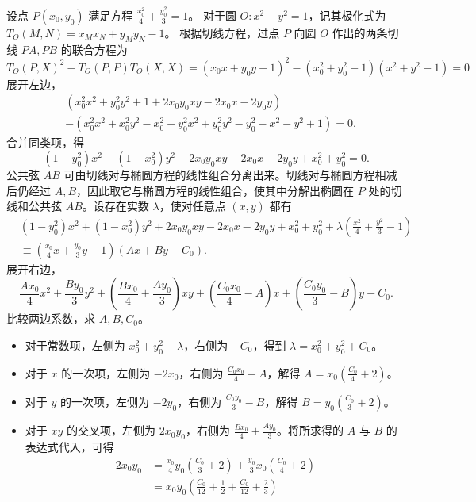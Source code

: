 \begin{solution}
设点 $P(x_0, y_0)$ 满足方程 $\frac{x_0^2}{4} + \frac{y_0^2}{3} = 1$。
对于圆 $O: x^2 + y^2 = 1$，记其极化式为 $T_O(M, N) = x_M x_N + y_M y_N - 1$。
根据切线方程，过点 $P$ 向圆 $O$ 作出的两条切线 $PA, PB$ 的联合方程为
\[ T_O(P, X)^2 - T_O(P, P)T_O(X, X)=(x_0 x + y_0 y - 1)^2 - (x_0^2 + y_0^2 - 1)(x^2 + y^2 - 1) = 0\]
展开左边，
\begin{align*}
& (x_0^2 x^2 + y_0^2 y^2 + 1 + 2x_0 y_0 xy - 2x_0 x - 2y_0 y) \\
& - (x_0^2 x^2 + x_0^2 y^2 - x_0^2 + y_0^2 x^2 + y_0^2 y^2 - y_0^2 - x^2 - y^2 + 1) = 0.
\end{align*}
合并同类项，得
\[ (1 - y_0^2)x^2 + (1 - x_0^2)y^2 + 2x_0 y_0 xy - 2x_0 x - 2y_0 y + x_0^2 + y_0^2 = 0. \]
公共弦 $AB$ 可由切线对与椭圆方程的线性组合分离出来。切线对与椭圆方程相减后仍经过 $A,B$，因此取它与椭圆方程的线性组合，使其中分解出椭圆在 $P$ 处的切线和公共弦 $AB$。设存在实数 $\lambda$，使对任意点 $(x, y)$ 都有
\begin{align*}
& (1 - y_0^2)x^2 + (1 - x_0^2)y^2 + 2x_0 y_0 xy - 2x_0 x - 2y_0 y + x_0^2 + y_0^2 + \lambda\left(\frac{x^2}{4} + \frac{y^2}{3} - 1\right) \\
& \equiv \left(\frac{x_0}{4} x + \frac{y_0}{3} y - 1\right)(Ax + By + C_0).
\end{align*}
展开右边，
\[ \frac{A x_0}{4}x^2 + \frac{B y_0}{3}y^2 + \left(\frac{B x_0}{4} + \frac{A y_0}{3}\right)xy + \left(\frac{C_0 x_0}{4} - A\right)x + \left(\frac{C_0 y_0}{3} - B\right)y - C_0. \]
比较两边系数，求 $A,B,C_0$。
\begin{itemize}
\item 对于常数项，左侧为 $x_0^2 + y_0^2 - \lambda$，右侧为 $-C_0$，得到 $\lambda = x_0^2 + y_0^2 + C_0$。
\item 对于 $x$ 的一次项，左侧为 $-2x_0$，右侧为 $\frac{C_0 x_0}{4} - A$，解得 $A = x_0\left(\frac{C_0}{4} + 2\right)$。
\item 对于 $y$ 的一次项，左侧为 $-2y_0$，右侧为 $\frac{C_0 y_0}{3} - B$，解得 $B = y_0\left(\frac{C_0}{3} + 2\right)$。
\item 对于 $xy$ 的交叉项，左侧为 $2x_0 y_0$，右侧为 $\frac{B x_0}{4} + \frac{A y_0}{3}$。将所求得的 $A$ 与 $B$ 的表达式代入，可得
\begin{align*}
2x_0 y_0 &= \frac{x_0}{4} y_0 \left(\frac{C_0}{3} + 2\right) + \frac{y_0}{3} x_0 \left(\frac{C_0}{4} + 2\right) \\
&= x_0 y_0 \left( \frac{C_0}{12} + \frac{1}{2} + \frac{C_0}{12} + \frac{2}{3} \right) \\

\end{align*}
\end{itemize}
\end{solution}
